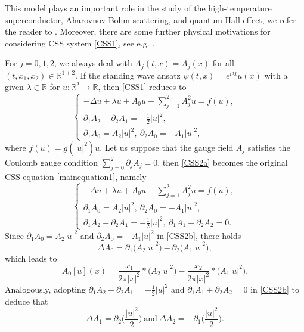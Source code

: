 \documentclass[11pt]{amsart}
\numberwithin{equation}{section}
\theoremstyle{definition}
\newcommand{\R}{\mathbb{R}}
\begin{document}
This model plays an important role in
the study of the high-temperature superconductor, Aharovnov-Bohm scattering, and quantum Hall effect,
we refer the reader to \cite{Jackiw1,Jackiw2,Jackiw3}. Moreover, there are some further physical motivations
for considering CSS system \eqref{CSS1}, see e.g.
\cite{Dunne,Huh1,LS1,LS2}.

For $j=0,1,2$, we always deal with $A_j(t,x)=A_j(x)$ for all $(t,x_1,x_2)\in\R^{1+2}$.
If the standing wave ansatz $\psi(t,x)=e^{\text{i}\lambda t}u(x)$ with a given $\lambda\in\R$
for $u:\R^2\to\R$, then \eqref{CSS1} reduces to
\begin{equation}\label{CSS2a}
	\left\{
	\begin{array}{ll}
		\displaystyle  -\Delta u+\lambda u+A_0 u+\sum_{j=1}^2A_j^2 u=f(u),  \\
		\displaystyle     \partial_1A_2-\partial_2A_1=-\frac{1}{2}|u|^2,\\
		\displaystyle    \partial_1A_0=A_2|u|^2,~ \partial_2A_0=-A_1|u|^2,
	\end{array}
	\right.
\end{equation}
where $f(u)=g(|u|^2)u$. Let us suppose that the gauge field $A_j$ satisfies the Coulomb gauge condition
$\sum_{j=0}^2\partial_jA_j= 0$, then
\eqref{CSS2a} becomes the original CSS equation \eqref{mainequation1}, namely
\begin{equation}\label{CSS2b}
	\left\{
	\begin{array}{ll}
		\displaystyle    -\Delta u+\lambda u+A_0 u+\sum_{j=1}^2A_j^2 u=f(u),  \\
		\displaystyle    \partial_1A_0=A_2|u|^2,~ \partial_2A_0=-A_1|u|^2,\\
		\displaystyle  \partial_1A_2-\partial_2A_1=-\frac{1}{2}|u|^2,~
		\partial_1A_1+\partial_2A_2 =0.
	\end{array}
	\right.
\end{equation}
Since $\partial_1A_0=A_2|u|^2$ and $\partial_2A_0=-A_1|u|^2$
in \eqref{CSS2b}, there holds
\[
\Delta A_0 =\partial_1\big(A_2|u|^2\big)-\partial_2\big(A_1|u|^2\big),
\]
which leads to
\begin{equation}\label{CSS2d}
	A_0[u](x)=\frac{x_1}{2\pi |x|^2}\ast \big(A_2|u|^2\big)
	-\frac{x_2}{2\pi |x|^2}\ast \big(A_1|u|^2\big).
\end{equation}
Analogously, adopting $\partial_1A_2-\partial_2A_1=-\frac{1}{2}|u|^2$ and
$\partial_1A_1+\partial_2A_2 =0$ in \eqref{CSS2b} to deduce that
\[
\Delta A_1= \partial_2\bigg(\frac{|u|^2}{2}\bigg)~ \text{and}~
\Delta A_2= -\partial_1\bigg(\frac{|u|^2}{2}\bigg).
\]
\end{document}
